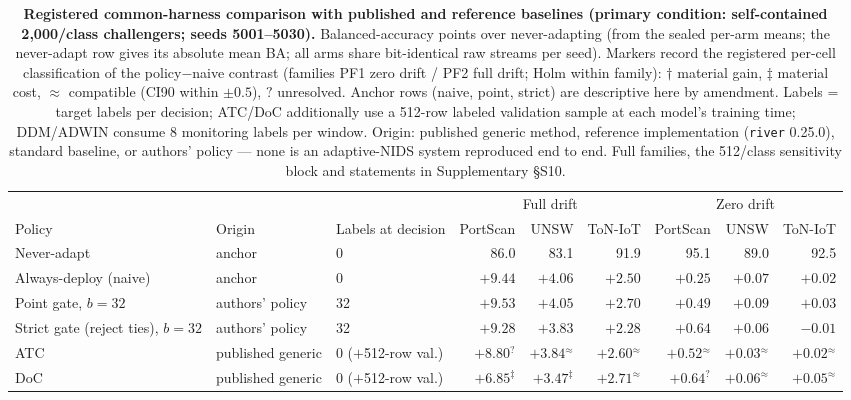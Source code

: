 \begin{table}[t]
\centering
\caption{\textbf{Registered common-harness comparison with published and reference baselines
(primary condition: self-contained 2{,}000/class challengers; seeds 5001--5030).} Balanced-accuracy
points over never-adapting (from the sealed per-arm means; the never-adapt row gives its absolute
mean BA; all arms share bit-identical raw streams per seed). Markers record the registered per-cell classification of the policy$-$naive
contrast (families PF1 zero drift / PF2 full drift; Holm within family): $\dagger$ material
gain, $\ddagger$ material cost, $\approx$ compatible (CI90 within $\pm0.5$), $?$ unresolved.
Anchor rows (naive, point, strict) are descriptive here by amendment. Labels = target labels
per decision; ATC/DoC additionally use a 512-row labeled validation sample at each model's
training time; DDM/ADWIN consume 8 monitoring labels per window. Origin: published generic
method, reference implementation (\texttt{river} 0.25.0), standard baseline, or authors'
policy --- none is an adaptive-NIDS system reproduced end to end. Full families, the 512/class
sensitivity block and statements in Supplementary \S S10.}
\label{tab:common_harness}
\scriptsize
\setlength{\tabcolsep}{2pt}
\renewcommand{\arraystretch}{1.08}
\begin{tabular}{l l l r r r r r r}
\toprule
 & & & \multicolumn{3}{c}{Full drift} & \multicolumn{3}{c}{Zero drift} \\
\cmidrule(lr){4-6}\cmidrule(lr){7-9}
Policy & Origin & Labels at decision & PortScan & UNSW & ToN-IoT & PortScan & UNSW & ToN-IoT \\
\midrule
Never-adapt & anchor & 0 & 86.0 & 83.1 & 91.9 & 95.1 & 89.0 & 92.5 \\
Always-deploy (naive) & anchor & 0 & $+9.44$ & $+4.06$ & $+2.50$ & $+0.25$ & $+0.07$ & $+0.02$ \\
Point gate, $b{=}32$ & authors' policy & 32 & $+9.53$ & $+4.05$ & $+2.70$ & $+0.49$ & $+0.09$ & $+0.03$ \\
Strict gate (reject ties), $b{=}32$ & authors' policy & 32 & $+9.28$ & $+3.83$ & $+2.28$ & $+0.64$ & $+0.06$ & $-0.01$ \\
ATC \cite{garg2022atc} & published generic & 0 ($+$512-row val.) & $+8.80$$^{?}$ & $+3.84$$^{\approx}$ & $+2.60$$^{\approx}$ & $+0.52$$^{\approx}$ & $+0.03$$^{\approx}$ & $+0.02$$^{\approx}$ \\
DoC \cite{guillory2021doc} & published generic & 0 ($+$512-row val.) & $+6.85$$^{\ddagger}$ & $+3.47$$^{\ddagger}$ & $+2.71$$^{\approx}$ & $+0.64$$^{?}$ & $+0.06$$^{\approx}$ & $+0.05$$^{\approx}$ \\

\end{tabular}
\end{table}
